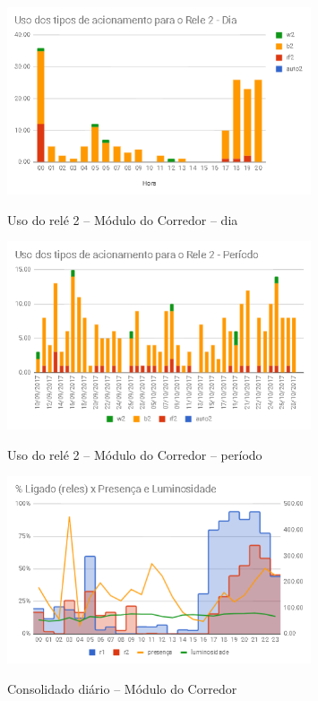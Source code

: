 \begin{figure}[H]
	\centering
	\caption{Uso do relé 2 -- Módulo do Corredor -- dia}
	\includegraphics[width=0.8\textwidth]{usoRele2CorredorDia}
	\label{fig:usoRele2CorredorDia}
\end{figure}

\begin{figure}[H]
	\centering
	\caption{Uso do relé 2 -- Módulo do Corredor -- período}
	\includegraphics[width=0.8\textwidth]{UsoRele2CorredorPeriodo}
	\label{fig:UsoRele2CorredorPeriodo}
\end{figure}

\begin{figure}[H]
	\centering
	\caption{Consolidado diário -- Módulo do Corredor}
	\includegraphics[width=0.8\textwidth]{RelesTempLuminosidadeCorredor}
	\label{fig:RelesTempLuminosidadeCorredor}
\end{figure}

